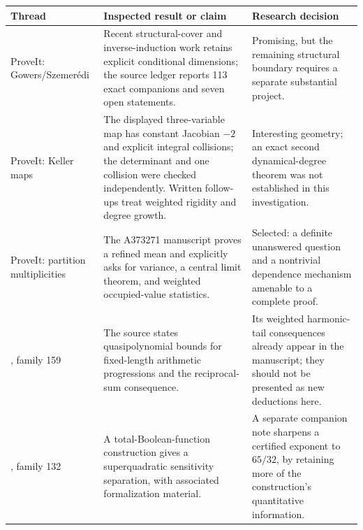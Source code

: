 \documentclass[11pt,letterpaper]{article}
\numberwithin{equation}{section}
\theoremstyle{definition}\newtheorem{definition}[theorem]{Definition}
\theoremstyle{remark}\newtheorem{remark}[theorem]{Remark}
\newcommand{\code}[1]{\texttt{\detokenize{#1}}}
\begin{document}
\begin{center}\small
\begin{tabular}{@{}>{\raggedright\arraybackslash}p{}>{\raggedright\arraybackslash}p{}>{\raggedright\arraybackslash}p{}@{}}
\toprule
Thread & Inspected result or claim & Research decision\\
\midrule
ProveIt: Gowers/Szemer\'edi & Recent structural-cover and inverse-induction
work retains explicit conditional dimensions; the source ledger reports
113 exact companions and seven open statements. & Promising, but the
remaining structural boundary requires a separate substantial project.\\[5pt]
ProveIt: Keller maps & The displayed three-variable map has constant
Jacobian $-2$ and explicit integral collisions; the determinant and one
collision were checked independently. Written follow-ups treat weighted
rigidity and degree growth. & Interesting geometry; an exact second
dynamical-degree theorem was not established in this investigation.\\[5pt]
ProveIt: partition multiplicities & The A373271 manuscript proves a
refined mean and explicitly asks for variance, a central limit theorem,
and weighted occupied-value statistics. & Selected: a definite unanswered
question and a nontrivial dependence mechanism amenable to a complete
proof.\\[5pt]
\code{math}, family 159 & The source states quasipolynomial bounds for
fixed-length arithmetic progressions and the reciprocal-sum consequence. &
Its weighted harmonic-tail consequences already appear in the manuscript;
they should not be presented as new deductions here.\\[5pt]
\code{math}, family 132 & A total-Boolean-function construction gives
a superquadratic sensitivity separation, with associated formalization
material. & A separate companion note sharpens a certified exponent to
$65/32$, by retaining more of the construction's quantitative information.\\
\bottomrule
\end{tabular}
\end{center}
\end{document}
